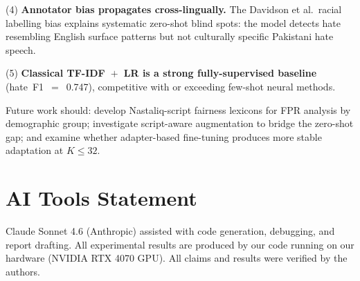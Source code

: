 \documentclass{article}
\begin{document}
\noindent(4) \textbf{Annotator bias propagates cross-lingually.}
The Davidson et al.\ racial labelling bias explains systematic zero-shot
blind spots: the model detects hate resembling English surface patterns
but not culturally specific Pakistani hate speech.

\noindent(5) \textbf{Classical TF-IDF~$+$~LR is a strong fully-supervised
baseline} (hate~F1~$=$~0.747), competitive with or exceeding few-shot
neural methods.

Future work should: develop Nastaliq-script fairness lexicons for FPR
analysis by demographic group; investigate
script-aware augmentation to bridge the zero-shot gap; and examine
whether adapter-based fine-tuning produces more stable adaptation
at $K \leq 32$.

\section*{AI Tools Statement}
Claude Sonnet 4.6 (Anthropic) assisted with code generation, debugging, and
report drafting. All experimental results are produced by our code running on
our hardware (NVIDIA RTX 4070 GPU). All claims and results were verified by
the authors.



\end{document}
